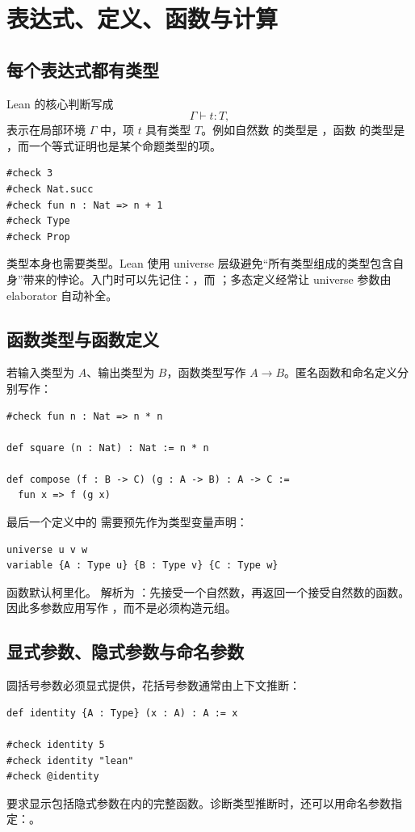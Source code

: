 \chapter{表达式、定义、函数与计算}

\section{每个表达式都有类型}

Lean 的核心判断写成
\[
\Gamma \vdash t : T,
\]
表示在局部环境 $\Gamma$ 中，项 $t$ 具有类型 $T$。例如自然数  的类型是 ，函数  的类型是 ，而一个等式证明也是某个命题类型的项。

\begin{lstlisting}
#check 3
#check Nat.succ
#check fun n : Nat => n + 1
#check Type
#check Prop
\end{lstlisting}

类型本身也需要类型。Lean 使用 universe 层级避免“所有类型组成的类型包含自身”带来的悖论。入门时可以先记住：，而 ；多态定义经常让 universe 参数由 elaborator 自动补全。

\section{函数类型与函数定义}

若输入类型为 $A$、输出类型为 $B$，函数类型写作 $A\to B$。匿名函数和命名定义分别写作：
\begin{lstlisting}
#check fun n : Nat => n * n

def square (n : Nat) : Nat := n * n

def compose (f : B -> C) (g : A -> B) : A -> C :=
  fun x => f (g x)
\end{lstlisting}
最后一个定义中的  需要预先作为类型变量声明：
\begin{lstlisting}
universe u v w
variable {A : Type u} {B : Type v} {C : Type w}
\end{lstlisting}

函数默认柯里化。 解析为 ：先接受一个自然数，再返回一个接受自然数的函数。因此多参数应用写作 ，而不是必须构造元组。

\section{显式参数、隐式参数与命名参数}

圆括号参数必须显式提供，花括号参数通常由上下文推断：
\begin{lstlisting}
def identity {A : Type} (x : A) : A := x

#check identity 5
#check identity "lean"
#check @identity
\end{lstlisting}
 要求显示包括隐式参数在内的完整函数。诊断类型推断时，还可以用命名参数指定：。

